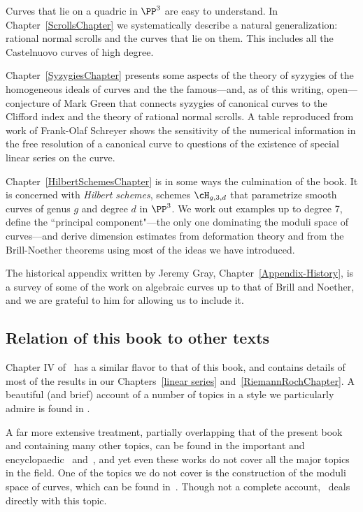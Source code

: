 Curves that lie on a quadric in $\PP^3$ are easy to understand. In Chapter~\ref{ScrollsChapter} we systematically describe a natural generalization: rational normal scrolls and the curves that lie on them. This includes all the Castelnuovo curves of high degree. 

Chapter~\ref{SyzygiesChapter} presents some aspects of the theory of syzygies of the homogeneous ideals of curves and the the famous---and, as of this writing, open---conjecture of Mark Green that connects syzygies of canonical curves to the Clifford index and the theory of rational normal scrolls. A table reproduced from work of Frank-Olaf Schreyer shows the sensitivity of the numerical information in the free resolution of a canonical curve to questions of the existence of special linear series on the curve.

Chapter~\ref{HilbertSchemesChapter} is in some ways the culmination of the book. It is concerned with \emph{Hilbert schemes}, schemes $\cH_{g,3,d}$ that parametrize smooth curves of genus $g$ and degree $d$  in $\PP^3$. We work out examples up to degree 7, define the ``principal component"---the only one dominating the moduli space of curves---and derive dimension estimates from deformation theory and from the Brill-Noether theorems
using most of the ideas we have introduced. 

The historical appendix written by Jeremy Gray, Chapter~\ref{Appendix-History},  is a survey of some of the work on
algebraic curves up to that of Brill and Noether, and we are grateful to him for allowing us to include it.

\subsection{Relation of this book to other texts} 
Chapter IV of~\cite{Hartshorne1977} has a similar flavor to that of this book, and contains details of most of the 
results in our Chapters~\ref{linear series} and~\ref{RiemannRochChapter}. A beautiful (and brief) account of a number of topics in a style we particularly admire is found in \cite{MumfordCJ}.

A far more extensive treatment, partially overlapping that of the present book and containing many other topics, can be found in the important and encyclopaedic~\cite{ACGH} and~\cite{ACG}, and yet even these works do not cover all the major topics in the field. 
One of the topics we do not cover is the construction of the moduli space of curves, which can be found
in~\cite{ACG}. Though not a complete account,~\cite{HarrisMorrison1998} deals directly with this
topic. 


